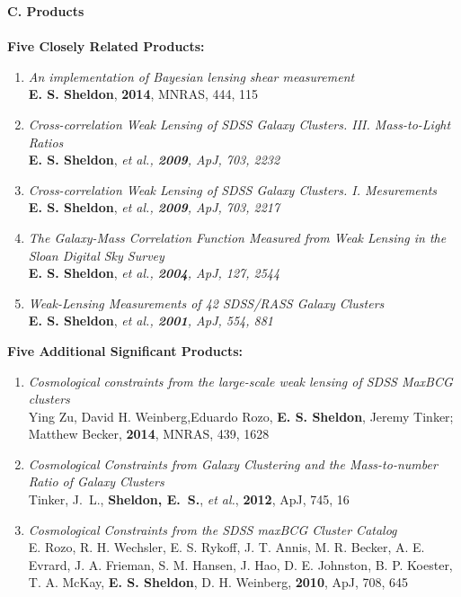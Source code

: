 \documentclass[10pt]{article}
\begin{document}
{\large \bf C. Products}\\
\vspace{-0.75em}\\
{\bf Five Closely Related Products:}
\begin{enumerate}

    \item \textit{An implementation of Bayesian lensing shear measurement}\\
        {\bf E. S. Sheldon}, {\bf 2014}, MNRAS, 444, 115

    \item \textit{Cross-correlation Weak Lensing of SDSS Galaxy Clusters. III. Mass-to-Light Ratios}\\
        {\bf E. S. Sheldon}, \em{et al.}, {\bf 2009}, ApJ, 703, 2232

    \item \textit{Cross-correlation Weak Lensing of SDSS Galaxy Clusters. I. Mesurements}\\
        {\bf E. S. Sheldon}, \em{et al.}, {\bf 2009}, ApJ, 703, 2217

    \item \textit{The Galaxy-Mass Correlation Function Measured from Weak Lensing in the Sloan Digital Sky Survey}\\
        {\bf E. S. Sheldon}, \em{et al.}, {\bf 2004}, ApJ, 127, 2544

    \item \textit{Weak-Lensing Measurements of 42 SDSS/RASS Galaxy Clusters}\\
        {\bf E. S. Sheldon}, \em{et al.}, {\bf 2001}, ApJ, 554, 881

\end{enumerate}
{\bf Five Additional Significant Products:}
\vspace{-0.5em}
\begin{enumerate}

    \item \textit{Cosmological constraints from the large-scale weak lensing of SDSS MaxBCG clusters}\\
        Ying Zu, David H. Weinberg,Eduardo Rozo, {\bf E. S. Sheldon}, Jeremy Tinker; Matthew Becker,
        {\bf 2014}, MNRAS, 439, 1628

    \item \textit{Cosmological Constraints from Galaxy Clustering and the Mass-to-number Ratio of Galaxy Clusters}\\
        Tinker, J.~L., {\bf Sheldon, E.~S.}, {\em et al.}, {\bf 2012}, ApJ, 745, 16

    \item \textit{Cosmological Constraints from the SDSS maxBCG Cluster Catalog}\\
        E. Rozo, R. H. Wechsler, E. S. Rykoff, J. T. Annis, 
        M. R. Becker, A. E. Evrard, J. A. Frieman, S. M. Hansen, 
        J. Hao, D. E. Johnston, B. P. Koester, T. A. McKay, 
        {\bf E. S. Sheldon}, D. H. Weinberg, {\bf 2010}, ApJ, 708, 645

\end{enumerate}
\end{document}
